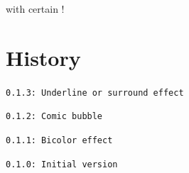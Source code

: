 \documentclass[11pt,a4paper]{ltxdoc}
\begin{document}
\begin{DemoCode}{}
 with
 certain
!
\end{DemoCode}

\pagebreak

\section{History}

\texttt{0.1.3: Underline or surround effect}

\texttt{0.1.2: Comic bubble}

\texttt{0.1.1: Bicolor effect}

\texttt{0.1.0: Initial version}
\end{document}
